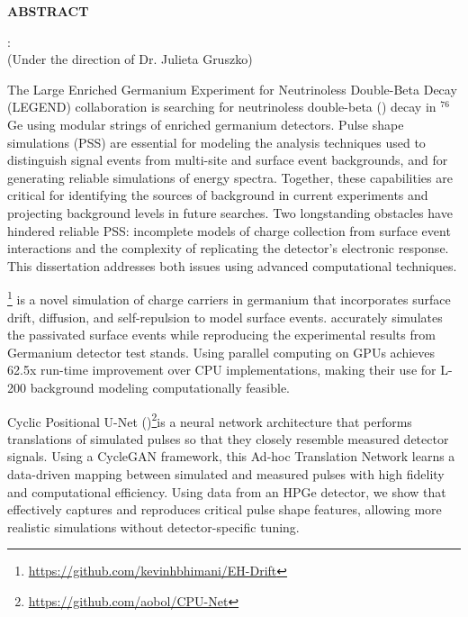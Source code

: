 \begin{center}
\vspace*{52pt}
{\normalfont\textbf{ABSTRACT}}
\vspace{11pt}

\begin{singlespace}
{\authorname}: {\thesistitle}\\
(Under the direction of Dr. Julieta Gruszko)
\end{singlespace}
\end{center}
The Large Enriched Germanium Experiment for Neutrinoless Double-Beta Decay (LEGEND) collaboration is searching for neutrinoless double-beta ({\onbb}) decay in ${}^{76}$Ge using modular strings of enriched germanium detectors. Pulse shape simulations (PSS) are essential for modeling the analysis techniques used to distinguish signal events from multi-site and surface event backgrounds, and for generating reliable simulations of energy spectra. Together, these capabilities are critical for identifying the sources of background in current experiments and projecting background levels in future searches. Two longstanding obstacles have hindered reliable PSS: incomplete models of charge collection from surface event interactions and the complexity of replicating the detector’s electronic response. This dissertation addresses both issues using advanced computational techniques.

{\ehd}\footnote{\url{https://github.com/kevinhbhimani/EH-Drift}} is a novel simulation of charge carriers in germanium that incorporates surface drift, diffusion, and self-repulsion to model surface events. {\ehd} accurately simulates the passivated surface events while reproducing the experimental results from Germanium detector test stands. Using parallel computing on GPUs {\ehd} achieves 62.5x run-time improvement over CPU implementations, making their use for L-200 background modeling computationally feasible.

Cyclic Positional U-Net ({\cpunet})\footnote{\url{https://github.com/aobol/CPU-Net}}is a neural network architecture that performs translations of simulated pulses so that they closely resemble measured detector signals. Using a CycleGAN framework, this Ad-hoc Translation Network learns a data-driven mapping between simulated and measured pulses with high fidelity and computational efficiency. Using data from an HPGe detector, we show that {\cpunet} effectively captures and reproduces critical pulse shape features, allowing more realistic simulations without detector-specific tuning.